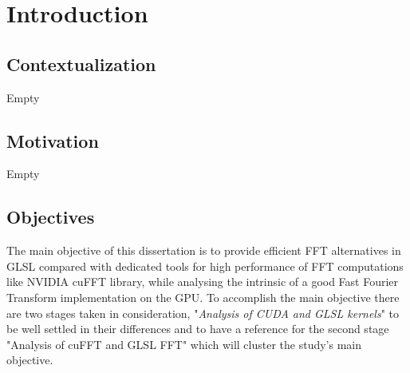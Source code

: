\documentclass[
  oneside,
  11pt, a4paper,
  footinclude=true,
  headinclude=true,
  cleardoublepage=empty
]{scrbook}
\begin{document}
    \cleardoublepage
    
    \setcounter{page}{3}
    
    \cleardoublepage
    \tableofcontents
    
    
    

    \printglossary[type=\acronymtype]
    
    \cleardoublepage
    \setcounter{page}{5}


\chapter{Introduction} \label{chap:introduction}

\section{Contextualization} \label{sec:contextualization}

Empty

\section{Motivation} \label{sec:motivation}

Empty

\section{Objectives} \label{sec:objectives}

The main objective of this dissertation is to provide efficient FFT alternatives in GLSL compared with dedicated tools for high performance of FFT computations like NVIDIA cuFFT library, while analysing the intrinsic of a good Fast Fourier Transform implementation on the GPU.
To accomplish the main objective there are two stages taken in consideration, "\textit{Analysis of CUDA and GLSL kernels}" to be well settled in their differences and to have a reference for the second stage "Analysis of cuFFT and GLSL FFT" which will cluster the study's main objective.
\end{document}
